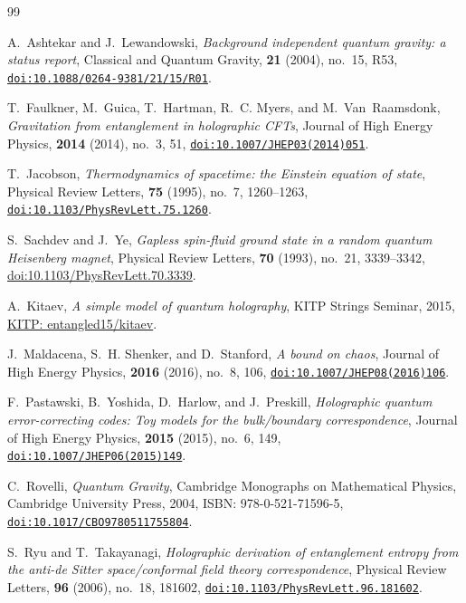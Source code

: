 \documentclass[11pt,a4paper,reqno]{amsart}
\theoremstyle{definition}
\numberwithin{equation}{section}
\providecommand{\doi}[1]{\href{https://doi.org/#1}{\nolinkurl{doi:#1}}}
\begin{document}
\begin{thebibliography}{99}

A.~Ashtekar and J.~Lewandowski,
\emph{Background independent quantum gravity: a status report},
Classical and Quantum Gravity, \textbf{21} (2004), no.~15, R53,
\doi{10.1088/0264-9381/21/15/R01}.

T.~Faulkner, M.~Guica, T.~Hartman, R.~C. Myers, and M.~Van~Raamsdonk,
\emph{Gravitation from entanglement in holographic CFTs},
Journal of High Energy Physics, \textbf{2014} (2014), no.~3, 51,
\doi{10.1007/JHEP03(2014)051}.

T.~Jacobson,
\emph{Thermodynamics of spacetime: the Einstein equation of state},
Physical Review Letters, \textbf{75} (1995), no.~7, 1260--1263,
\doi{10.1103/PhysRevLett.75.1260}.

 S.~Sachdev and J.~Ye, \emph{Gapless spin-fluid ground state in a random quantum Heisenberg magnet}, Physical Review Letters, \textbf{70} (1993), no.~21, 3339--3342, \href{https://doi.org/10.1103/PhysRevLett.70.3339}{doi:10.1103/PhysRevLett.70.3339}.

 A.~Kitaev, \emph{A simple model of quantum holography}, KITP Strings Seminar, 2015, \href{http://online.kitp.ucsb.edu/online/entangled15/kitaev/}{KITP: entangled15/kitaev}.

J.~Maldacena, S.~H. Shenker, and D.~Stanford,
\emph{A bound on chaos},
Journal of High Energy Physics, \textbf{2016} (2016), no.~8, 106,
\doi{10.1007/JHEP08(2016)106}.

F.~Pastawski, B.~Yoshida, D.~Harlow, and J.~Preskill,
\emph{Holographic quantum error-correcting codes: Toy models for the bulk/boundary correspondence},
Journal of High Energy Physics, \textbf{2015} (2015), no.~6, 149,
\doi{10.1007/JHEP06(2015)149}.

C.~Rovelli,
\emph{Quantum Gravity},
Cambridge Monographs on Mathematical Physics, Cambridge University Press, 2004,
ISBN: 978-0-521-71596-5,
\doi{10.1017/CBO9780511755804}.

S.~Ryu and T.~Takayanagi,
\emph{Holographic derivation of entanglement entropy from the anti-de Sitter space/conformal field theory correspondence},
Physical Review Letters, \textbf{96} (2006), no.~18, 181602,
\doi{10.1103/PhysRevLett.96.181602}.


\end{thebibliography}
\end{document}
